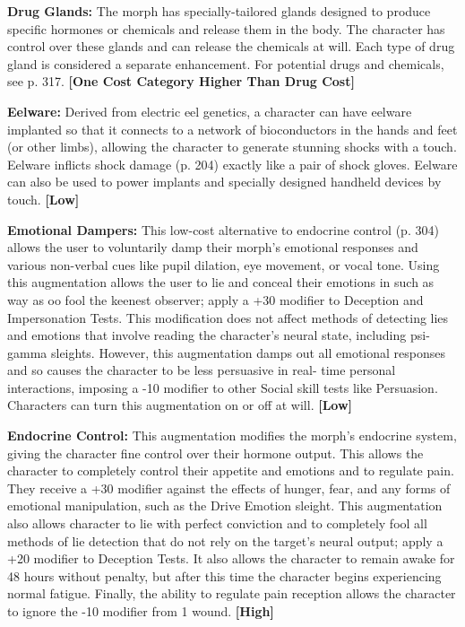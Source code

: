 \textbf{Drug Glands:} The morph has specially-tailored glands designed to produce specific hormones or chemicals and release them in the body. The character has control over these glands and can release the chemicals at will. Each type of drug gland is considered a separate enhancement. For potential drugs and chemicals, see p. 317. \textbf{[One Cost Category Higher Than Drug Cost]}

\textbf{Eelware:} Derived from electric eel genetics, a character can have eelware implanted so that it connects to a network of bioconductors in the hands and feet (or other limbs), allowing the character to generate stunning shocks with a touch. Eelware inflicts shock damage (p. 204) exactly like a pair of shock gloves. Eelware can also be used to power implants and specially designed handheld devices by touch. \textbf{[Low]}

\textbf{Emotional Dampers:} This low-cost alternative to endocrine control (p. 304) allows the user to voluntarily damp their morph’s emotional responses and various non-verbal cues like pupil dilation, eye movement, or vocal tone. Using this augmentation allows the user to lie and conceal their emotions in such as way as oo fool the keenest observer; apply a +30 modifier to Deception and Impersonation Tests. This modification does not affect methods of detecting lies and emotions that involve reading the character’s neural state, including psi-gamma sleights. However, this augmentation damps out all emotional responses and so causes the character to be less persuasive in real- time personal interactions, imposing a -10 modifier to other Social skill tests like Persuasion. Characters can turn this augmentation on or off at will. \textbf{[Low]}

\textbf{Endocrine Control:} This augmentation modifies the morph’s endocrine system, giving the character fine control over their hormone output. This allows the character to completely control their appetite and emotions and to regulate pain. They receive a +30 modifier against the effects of hunger, fear, and any forms of emotional manipulation, such as the Drive Emotion sleight. This augmentation also allows character to lie with perfect conviction and to completely fool all methods of lie detection that do not rely on the target’s neural output; apply a +20 modifier to Deception Tests. It also allows the character to remain awake for 48 hours without penalty, but after this time the character begins experiencing normal fatigue. Finally, the ability to regulate pain reception allows the character to ignore the -10 modifier from 1 wound. \textbf{[High]}

